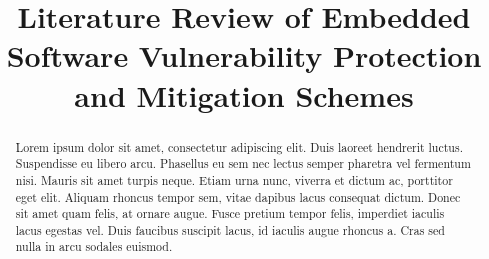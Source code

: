 \documentclass[final,conference,11pt]{IEEEtran}
\begin{document}
%
\title{Literature Review of Embedded Software Vulnerability Protection and Mitigation Schemes}

\author{
}

\maketitle


\begin{abstract}
Lorem ipsum dolor sit amet, consectetur adipiscing elit. Duis laoreet hendrerit luctus. Suspendisse eu libero arcu. Phasellus eu sem nec lectus semper pharetra vel fermentum nisi. Mauris sit amet turpis neque. Etiam urna nunc, viverra et dictum ac, porttitor eget elit. Aliquam rhoncus tempor sem, vitae dapibus lacus consequat dictum. Donec sit amet quam felis, at ornare augue. Fusce pretium tempor felis, imperdiet iaculis lacus egestas vel. Duis faucibus suscipit lacus, id iaculis augue rhoncus a. Cras sed nulla in arcu sodales euismod.
\end{abstract}
\end{document}
